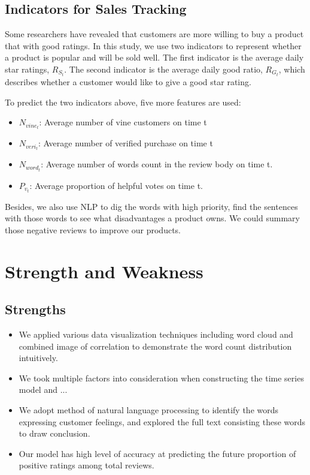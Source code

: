 \documentclass[12pt]{article}
\begin{document}
\subsection{Indicators for Sales Tracking}
Some researchers have revealed that customers are more willing to buy a product that with good ratings. In this study, we use two indicators to represent whether a product is popular and will be sold well. The first indicator is the average daily star ratings, $R_{S_{t}}$. The second indicator is the average daily good ratio, $R_{G_{t}}$, which describes whether a customer would like to give a good star rating. 

To predict the two indicators above, five more features are used:
\begin{itemize}
    \item $N_{vine_{t}}$: Average number of vine customers on time t
    \item $N_{veri_{t}}$: Average number of verified purchase on time t
    \item $N_{word_{t}}$: Average number of words count in the review body on time t.
    \item $P_{v_{t}}$: Average proportion of helpful votes on time t.
\end{itemize}

Besides, we also use NLP to dig the words with high priority, find the sentences with those words to see what disadvantages a product owns. We could summary those negative reviews to improve our products.

\section{Strength and Weakness}
\subsection{Strengths}
\begin{itemize}
    \item We applied various data visualization techniques including word cloud and combined image of correlation to demonstrate the word count distribution intuitively.
    \item We took multiple factors into consideration when constructing the time series model and ...
    \item We adopt method of natural language processing to identify the words expressing customer feelings, and explored the full text consisting these words to draw conclusion.
    \item Our model has high level of accuracy at predicting the future proportion of positive ratings among total reviews.
\end{itemize}
\end{document}
